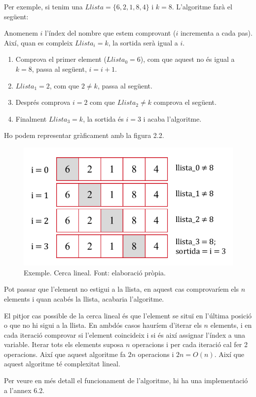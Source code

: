 Per exemple, si tenim una $Llista = \lbrace 6, 2, 1, 8, 4 \rbrace$ i $k = 8$. L'algoritme farà el següent:

Anomenem $i$ l'índex del nombre que estem comprovant ($i$ incrementa a cada pas). Així, quan es compleix $Llista_i = k$, la sortida serà igual a $i$.

\begin{enumerate}
    \item Comprova el primer element ($Llista_0 = 6$), com que aquest no és igual a $k = 8$, passa al següent, $i = i + 1$.
    \item $Llista_1 = 2$, com que $2 \neq k$, passa al següent.
    \item Després comprova $i = 2$ com que $Llista_2 \neq k$ comprova el següent.
    \item Finalment $Llista_3 = k$, la sortida és $i = 3$ i acaba l'algoritme.
\end{enumerate}

Ho podem representar gràficament amb la figura 2.2.
\begin{figure}[H]
    \centering
    \includegraphics[width=.55\textwidth]{capitols/figures/linearsearch (2).pdf}
    \caption[Exemple. Cerca lineal.]{Exemple. Cerca lineal. Font: elaboració pròpia.}
    \label{fig:my_label}
\end{figure}

Pot passar que l'element no estigui a la llista, en aquest cas comprovaríem els $n$ elements i quan acabés la llista, acabaria l'algoritme.

El pitjor cas possible de la cerca lineal és que l'element se situï en l'última posició o que no hi sigui a la llista. En ambdós casos hauríem d'iterar els $n$ elements, i en cada iteració comprovar si l'element coincideix i si és així assignar l'índex a una variable. Iterar tots els elements suposa $n$ operacions i per cada iteració cal fer 2 operacions. Així que aquest algoritme fa $2n$ operacions i $2n = O(n)$. Així que aquest algoritme té complexitat lineal. 

Per veure en més detall el funcionament de l'algoritme, hi ha una implementació a l'annex 6.2.

